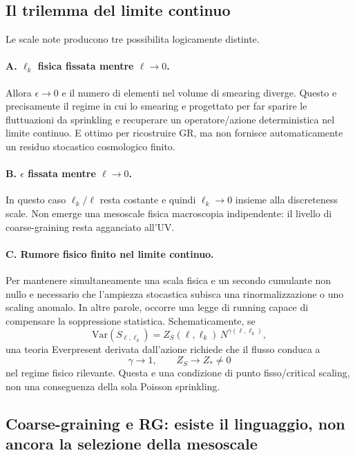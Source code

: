 \documentclass[11pt,a4paper]{article}
\begin{document}
\subsection{Il trilemma del limite continuo}

Le scale note producono tre possibilita logicamente distinte.

\paragraph{A. $\ell_k$ fisica fissata mentre $\ell\to0$.}
Allora $\epsilon\to0$ e il numero di elementi nel volume di smearing diverge. Questo e precisamente il regime in cui lo smearing e progettato per far sparire le fluttuazioni da sprinkling e recuperare un operatore/azione deterministica nel limite continuo. E ottimo per ricostruire GR, ma non fornisce automaticamente un residuo stocastico cosmologico finito.

\paragraph{B. $\epsilon$ fissata mentre $\ell\to0$.}
In questo caso $\ell_k/\ell$ resta costante e quindi $\ell_k\to0$ insieme alla discreteness scale. Non emerge una mesoscale fisica macroscopia indipendente: il livello di coarse-graining resta agganciato all'UV.

\paragraph{C. Rumore fisico finito nel limite continuo.}
Per mantenere simultaneamente una scala fisica e un secondo cumulante non nullo e necessario che l'ampiezza stocastica subisca una rinormalizzazione o uno scaling anomalo. In altre parole, occorre una legge di running capace di compensare la soppressione statistica. Schematicamente, se
\begin{equation}
 \mathrm{Var}(S_{\ell,\ell_k})
 = Z_S(\ell,\ell_k)\,N^{\gamma(\ell,\ell_k)},
\end{equation}
una teoria Everpresent derivata dall'azione richiede che il flusso conduca a
\begin{equation}
 \gamma\to1,
 \qquad
 Z_S\to Z_*\ne0
\end{equation}
nel regime fisico rilevante. Questa e una condizione di punto fisso/critical scaling, non una conseguenza della sola Poisson sprinkling.

\subsection{Coarse-graining e RG: esiste il linguaggio, non ancora la selezione della mesoscale}
\end{document}
